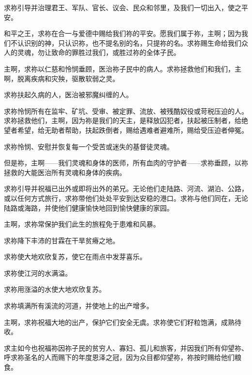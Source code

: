 求祢引导并治理君王、军队、官长、议会、民众和邻里，及我们一切出入，使之平安。\par

和平之王，求祢在合一与爱德中赐给我们祢的平安。愿我们属于祢，主啊；因为我们不认识别的神，只认识祢，也不提名别的名，只提祢的名。求祢赐生命给我们众人的灵魂，勿让致命的罪胜过我们，或胜过祢的全体子民。\par

主啊，求祢以仁慈和怜悯垂顾，医治祢子民中的病人。求祢拯救他们和我们，主啊，脱离疾病和灾殃，驱散软弱之灵。\par

求祢扶起久病的人，医治被邪魔纠缠的人。\par

求祢怜悯所有在监牢、矿坑、受审、被定罪、流放、被残酷奴役或苛税压迫的人。求祢拯救他们，主啊，因为祢是我们的天主，是释放囚犯者，扶起被压制者，给绝望者希望，给无助者帮助，扶起跌倒者，赐给遇难者避难所，赐给受压迫者伸冤。\par

求祢怜悯、安慰并恢复每一个受苦或迷失的基督徒灵魂。\par

但是祢，主啊——我们灵魂和身体的医师，所有血肉的守护者——求祢垂顾，以祢拯救的大能医治所有灵魂和身体的疾病。\par

求祢引导并祝福已出外或即将出外的弟兄。无论他们走陆路、河流、湖泊、公路，或以任何方式旅行，求祢带他们处处平安到达安稳的港口。求祢与他们同在，无论陆路或海路，并使他们健康愉快地回到愉快健康的家园。\par

主啊，求祢常保护我们此生的旅程免于患难和风暴。\par

求祢降下丰沛的甘霖在干旱贫瘠之地。\par

求祢使大地欢欣复苏，使它在雨点中发芽喜乐。\par

求祢使江河的水满溢。\par

求祢用涨溢的水使大地欢欣复苏。\par

求祢填满所有溪流的河道，并使地上的出产增多。\par

主啊，求祢祝福大地的出产，保护它们安全无虞。求祢使它们籽粒饱满，成熟待收。\par

求主如今也祝福祢因祢子民的贫穷人、寡妇、孤儿和旅客，并因我们所有仰望祢、呼求祢圣名的人而赐下的年度恩泽之冠，因为众目都仰望祢，祢按时赐给他们粮食。\par

